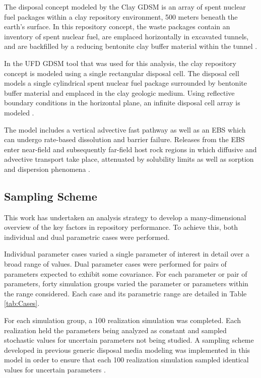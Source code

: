 The disposal concept modeled by the Clay \gls{GDSM} is an array of spent nuclear 
fuel packages within a clay repository environment, 500 meters beneath the 
earth's surface. In this repository concept, the waste packages contain an 
inventory of spent nuclear fuel, are emplaced horizontally in excavated tunnels, 
and are backfilled by a reducing bentonite clay buffer material within the 
tunnel \cite{nutt_generic_2009}. 

In the \gls{UFD} \gls{GDSM} tool that was used for this analysis, the clay 
repository concept is modeled using a single rectangular disposal cell. The 
disposal cell models a single cylindrical spent nuclear fuel package surrounded 
by bentonite buffer material and emplaced in the clay geologic medium. Using 
reflective boundary conditions in the horizontal plane, an infinite disposal 
cell array is modeled \cite{nutt_generic_2009}.

The model includes a vertical advective fast pathway as well as an \gls{EBS} which 
can undergo rate-based dissolution and barrier failure.  Releases from the 
\gls{EBS} enter near-field and subsequently far-field host rock regions in which 
diffusive and advective transport take place, attenuated by solubility limits as 
well as sorption and dispersion phenomena \cite{clayton_generic_2011}.

\subsection{Sampling Scheme}

This work has undertaken an analysis strategy to develop a many-dimensional 
overview of the key factors in repository performance. To achieve this, 
both individual and dual parametric cases were performed.

Individual parameter cases varied a single parameter of interest in 
detail over a broad range of values. Dual parameter cases were 
performed for pairs of parameters expected to exhibit some covariance. For 
each parameter or pair of parameters, forty simulation 
groups varied the parameter or parameters within the range considered. Each 
case and its parametric range are detailed in Table \ref{tab:Cases}. 



For each simulation group, a 100 realization simulation was completed. Each
realization held the parameters being analyzed as constant and sampled 
stochastic values for uncertain parameters not being studied.  A sampling scheme 
developed in previous generic disposal media modeling was implemented in this 
model in order to ensure that each 100 realization simulation sampled 
identical values for uncertain parameters \cite{clayton_generic_2011, 
nutt_generic_2009}.  


